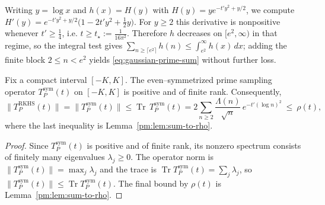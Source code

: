 \begin{remark}\label{rem:eventual-monotone}
Writing $y=\log x$ and $h(x)=H(y)$ with $H(y)=y e^{-t'y^2+y/2}$, we compute $H'(y)=e^{-t'y^2+y/2}\bigl(1-2t' y^2 + \tfrac12 y\bigr)$. For $y\ge 2$ this derivative is nonpositive whenever $t'\ge \tfrac14$, i.e. $t\ge t_\star:=\frac{1}{16\pi^2}$. Therefore $h$ decreases on $[e^2,\infty)$ in that regime, so the integral test gives $\sum_{n\ge \lceil e^2\rceil} h(n) \le \int_{e^2}^{\infty} h(x)\,dx$; adding the finite block $2\le n<e^2$ yields \eqref{eq:gaussian-prime-sum} without further loss.
\end{remark}

\begin{proposition}\label{pm:prop:norm-leq-rho}
Fix a compact interval $[-K,K]$. The even--symmetrized prime sampling operator $T_P^{\mathrm{sym}}(t)$ on $[-K,K]$ is positive and of finite rank. Consequently,
\begin{equation}\label{eq:Prime_norm_leq_rho-formula-1}
  \|T_P^{\mathrm{RKHS}}(t)\| = \|T_P^{\mathrm{sym}}(t)\| \le \operatorname{Tr}\,T_P^{\mathrm{sym}}(t)
  = 2\sum_{n\ge 2}\frac{\Lambda(n)}{\sqrt n}\,e^{-t'(\log n)^2}
  \ \le\ \rho(t),
\end{equation}
where the last inequality is Lemma~\ref{pm:lem:sum-to-rho}.
\end{proposition}

\begin{proof}
Since $T_P^{\mathrm{sym}}(t)$ is positive and of finite rank, its nonzero spectrum consists of finitely many eigenvalues $\lambda_j\ge 0$. The operator norm is $\|T_P^{\mathrm{sym}}(t)\|=\max_j \lambda_j$ and the trace is $\operatorname{Tr} T_P^{\mathrm{sym}}(t)=\sum_j \lambda_j$, so $\|T_P^{\mathrm{sym}}(t)\|\le \operatorname{Tr} T_P^{\mathrm{sym}}(t)$. The final bound by $\rho(t)$ is Lemma~\ref{pm:lem:sum-to-rho}.
\end{proof}

